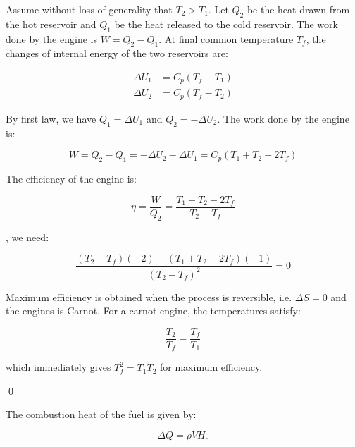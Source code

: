 \documentclass[12pt]{article}
\begin{document}
Assume without loss of generality that $T_{2} > T_{1}$. Let $Q_{2}$ be the heat drawn from the hot reservoir and $Q_{1}$ be the heat released to the cold reservoir. The work done by the engine is $W = Q_{2} - Q_{1}$. At final common temperature $T_{f}$, the changes of internal energy of the two reservoirs are:

\begin{equation}
    \begin{split}
        \Delta U_{1} &= C_{p} (T_{f} - T_{1}) \\
        \Delta U_{2} &= C_{p} (T_{f} - T_{2})
    \end{split}
\end{equation}

By first law, we have $Q_{1} = \Delta U_{1}$ and $Q_{2} = -\Delta U_{2}$. The work done by the engine is:

\begin{equation}
    W = Q_{2} - Q_{1} = -\Delta U_{2} - \Delta U_{1} = C_{p} (T_{1} + T_{2} - 2 T_{f})
\end{equation}

The efficiency of the engine is:

\begin{equation}
    \eta = \frac{W}{Q_{2}} = \frac{T_{1} + T_{2} - 2 T_{f}}{T_{2} - T_{f}}
\end{equation}

, we need:

\begin{equation}
    \frac{(T_{2} - T_{f})(-2) - (T_{1} + T_{2} - 2 T_{f})(-1)}{(T_{2} - T_{f})^{2}} = 0
\end{equation}

\begin{correction}
    Maximum efficiency is obtained when the process is reversible, i.e. $\Delta S = 0$ and the engines is Carnot. For a carnot engine, the temperatures satisfy:

    \begin{equation}
        \frac{T_{2}}{T_{f}} = \frac{T_{f}}{T_{1}}
    \end{equation}

    which immediately gives $T_{f}^{2} = T_{1}T_{2}$ for maximum efficiency.
\end{correction}
\qed


The combustion heat of the fuel is given by:

\begin{equation}
    \Delta Q = \rho V H_{c}
\end{equation}
\end{document}
